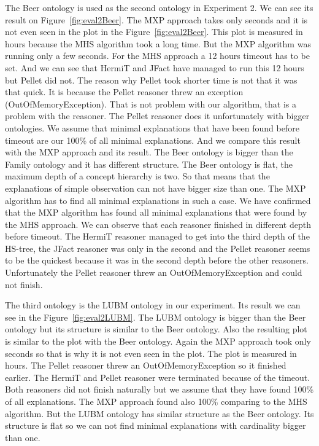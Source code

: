 \documentclass[12pt,a4paper]{article}
\begin{document}
The Beer ontology is used as the second ontology in Experiment 2. We can see its result on Figure~\ref{fig:eval2Beer}. The MXP approach takes only seconds and it is not even seen in the plot in the Figure~\ref{fig:eval2Beer}. This plot is measured in hours because the MHS algorithm took a long time. But the MXP algorithm was running only a few seconds. For the MHS approach a 12 hours timeout has to be set. And we can see that HermiT and JFact have managed to run this 12 hours but Pellet did not. The reason why Pellet took shorter time is not that it was that quick. It is because the Pellet reasoner threw an exception (OutOfMemoryException). That is not problem with our algorithm, that is a problem with the reasoner. The Pellet reasoner does it unfortunately with bigger ontologies. We assume that minimal explanations that have been found before timeout are our 100\% of all minimal explanations. And we compare this result with the MXP approach and its result. The Beer ontology is bigger than the Family ontology and it has different structure. The Beer ontology is flat, the maximum depth of a concept hierarchy is two. So that means that the explanations of simple observation can not have bigger size than one. The MXP algorithm has to find all minimal explanations in such a case. We have confirmed that the MXP algorithm has found all minimal explanations that were found by the MHS approach. We can observe that each reasoner finished in different depth before timeout. The HermiT reasoner managed to get into the third depth of the HS-tree, the JFact reasoner was only in the second and the Pellet reasoner seems to be the quickest because it was in the second depth before the other reasoners. Unfortunately the Pellet reasoner threw an OutOfMemoryException and could not finish.

The third ontology is the LUBM ontology in our experiment. Its result we can see in the Figure~\ref{fig:eval2LUBM}. The LUBM ontology is bigger than the Beer ontology but its structure is similar to the Beer ontology. Also the resulting plot is similar to the plot with the Beer ontology. Again the MXP approach took only seconds so that is why it is not even seen in the plot. The plot is measured in hours. The Pellet reasoner threw an OutOfMemoryException so it finished earlier. The HermiT and Pellet reasoner were terminated because of the timeout. Both reasoners did not finish naturally but we assume that they have found 100\% of all explanations. The MXP approach found also 100\% comparing to the MHS algorithm. But the LUBM ontology has similar structure as the Beer ontology. Its structure is flat so we can not find minimal explanations with cardinality bigger than one.
\end{document}
